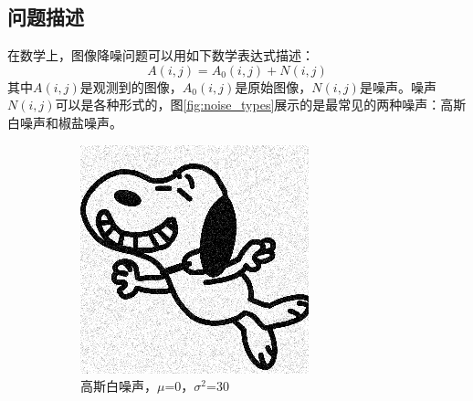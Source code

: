 \documentclass[12pt]{article}
\begin{document}
\subsection{问题描述}
在数学上，图像降噪问题可以用如下数学表达式描述\cite{SVDWhiteNoise}：
\begin{equation}
    A(i,j)=A_{0}(i,j)+N(i,j)
\end{equation}
其中$A(i,j)$是观测到的图像，$A_{0}(i,j)$是原始图像，$N(i,j)$是噪声。噪声$N(i,j)$可以是各种形式的，图\ref{fig:noise_types}展示的是最常见的两种噪声：高斯白噪声和椒盐噪声。
\begin{figure}[H]
    \centering
    \begin{subfigure}[b]{0.45\textwidth}
        \centering
        \includegraphics[width=\textwidth]{images/Gaussian_noise.png}
        \caption{高斯白噪声，$\mu$=0，$\sigma^2$=30}
    \end{subfigure}
    \hfill
    \begin{subfigure}[b]{0.45\textwidth}
        \centering

\end{subfigure}
\end{figure}
\end{document}

